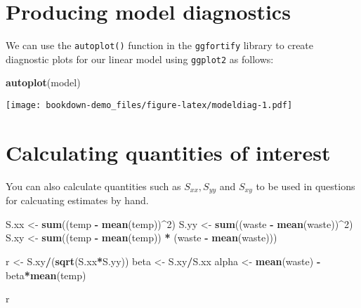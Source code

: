 \documentclass[
]{book}
\newenvironment{Shaded}{\begin{snugshade}}{\end{snugshade}}
\newcommand{\DecValTok}[1]{\textcolor[rgb]{0.00,0.00,0.81}{#1}}
\newcommand{\KeywordTok}[1]{\textcolor[rgb]{0.13,0.29,0.53}{\textbf{#1}}}
\newcommand{\NormalTok}[1]{#1}
\newcommand{\OperatorTok}[1]{\textcolor[rgb]{0.81,0.36,0.00}{\textbf{#1}}}
\newcommand{\StringTok}[1]{\textcolor[rgb]{0.31,0.60,0.02}{#1}}
\begin{document}
\hypertarget{producing-model-diagnostics}{%
\section{Producing model diagnostics}\label{producing-model-diagnostics}}

We can use the \texttt{autoplot()} function in the \texttt{ggfortify} library to create diagnostic plots for our linear model using \texttt{ggplot2} as follows:

\begin{Shaded}
\begin{Highlighting}[]
\KeywordTok{autoplot}\NormalTok{(model)}
\end{Highlighting}
\end{Shaded}

\texttt{[image: bookdown-demo\_files/figure-latex/modeldiag-1.pdf]}

\hypertarget{calculating-quantities-of-interest}{%
\section{Calculating quantities of interest}\label{calculating-quantities-of-interest}}

You can also calculate quantities such as \(S_{xx}, S_{yy}\) and \(S_{xy}\) to be used in questions for calcuating estimates by hand.

\begin{Shaded}
\begin{Highlighting}[]
\NormalTok{S.xx <-}\StringTok{ }\KeywordTok{sum}\NormalTok{((temp }\OperatorTok{-}\StringTok{ }\KeywordTok{mean}\NormalTok{(temp))}\OperatorTok{^}\DecValTok{2}\NormalTok{)}
\NormalTok{S.yy <-}\StringTok{ }\KeywordTok{sum}\NormalTok{((waste }\OperatorTok{-}\StringTok{ }\KeywordTok{mean}\NormalTok{(waste))}\OperatorTok{^}\DecValTok{2}\NormalTok{)}
\NormalTok{S.xy <-}\StringTok{ }\KeywordTok{sum}\NormalTok{((temp }\OperatorTok{-}\StringTok{ }\KeywordTok{mean}\NormalTok{(temp)) }\OperatorTok{*}\StringTok{ }\NormalTok{(waste }\OperatorTok{-}\StringTok{ }\KeywordTok{mean}\NormalTok{(waste)))}

\NormalTok{r <-}\StringTok{ }\NormalTok{S.xy}\OperatorTok{/}\NormalTok{(}\KeywordTok{sqrt}\NormalTok{(S.xx}\OperatorTok{*}\NormalTok{S.yy))}
\NormalTok{beta <-}\StringTok{ }\NormalTok{S.xy}\OperatorTok{/}\NormalTok{S.xx}
\NormalTok{alpha <-}\StringTok{ }\KeywordTok{mean}\NormalTok{(waste) }\OperatorTok{-}\StringTok{ }\NormalTok{beta}\OperatorTok{*}\KeywordTok{mean}\NormalTok{(temp)}

\NormalTok{r}
\end{Highlighting}
\end{Shaded}
\end{document}
